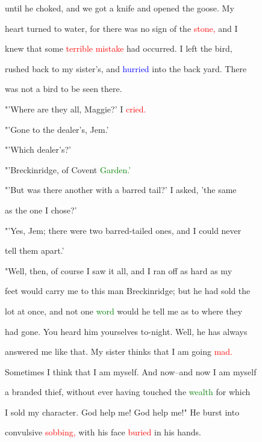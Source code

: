  until he choked, and we got a knife and opened the goose. My

 heart turned to water, for there was no sign of the \textcolor{red}{stone,} and I

 knew that some \textcolor{red}{terrible} \textcolor{red}{mistake} had occurred. I left the bird,

 rushed back to my sister's, and \textcolor{blue}{hurried} into the back yard. There

 was not a bird to be seen there.



 "'Where are they all, Maggie?' I \textcolor{red}{cried.}



 "'Gone to the dealer's, Jem.'



 "'Which dealer's?'



 "'Breckinridge, of Covent \textcolor{green}{Garden.'}



 "'But was there another with a barred tail?' I asked, 'the same

 as the one I chose?'



 "'Yes, Jem; there were two barred-tailed ones, and I could never

 tell them apart.'



 "Well, then, of course I saw it all, and I ran off as hard as my

 feet would carry me to this man Breckinridge; but he had sold the

 lot at once, and not one \textcolor{green}{word} would he tell me as to where they

 had gone. You heard him yourselves to-night. Well, he has always

 answered me like that. My sister thinks that I am going \textcolor{red}{mad.}

 Sometimes I think that I am myself. And now--and now I am myself

 a branded \textcolor{BurntOrange}{thief,} without ever having touched the \textcolor{green}{wealth} for which

 I sold my character. \textcolor{BurntOrange}{God} help me! \textcolor{BurntOrange}{God} help me!" He burst into

 convulsive \textcolor{red}{sobbing,} with his face \textcolor{red}{buried} in his hands.



